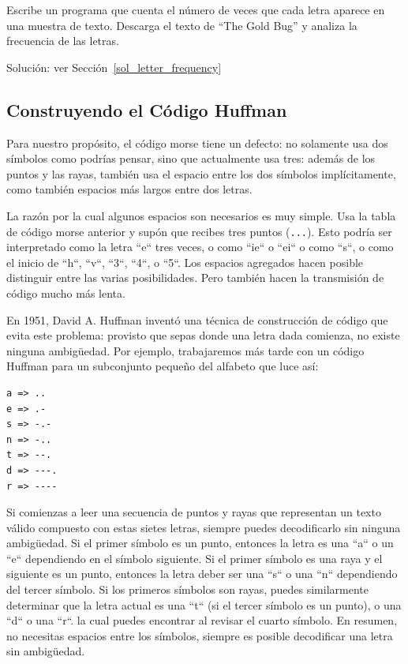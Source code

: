 \begin{exercise}
\label{letter_frequency}
Escribe un programa que cuenta el número de veces que cada letra 
aparece en una muestra de texto. Descarga el texto de ``The Gold Bug'' 
y analiza la frecuencia de las letras.

Solución: ver Sección~\ref{sol_letter_frequency}
\end{exercise}

\subsection{Construyendo el Código Huffman}

Para nuestro propósito, el código morse tiene un defecto: 
no solamente usa dos símbolos como podrías pensar, sino
que actualmente usa tres: además de los puntos y las rayas,
también usa el espacio entre los dos símbolos implícitamente,
como también espacios más largos entre dos letras.

La razón por la cual algunos espacios son necesarios es muy simple.
Usa la tabla de código morse anterior y supón que recibes 
tres puntos (\verb'...'). Esto podría ser interpretado como la letra
``e`` tres veces, o como ``ie`` o ``ei`` o como ``s``, o como el
inicio de ``h``, ``v``, ``3``, ``4``, o ``5``. Los espacios agregados 
hacen posible distinguir entre las varias posibilidades. Pero
también hacen la transmisión de código mucho más lenta.

En 1951, David A. Huffman inventó una técnica de construcción de código
que evita este problema: provisto que sepas donde una letra dada 
comienza, no existe ninguna ambigüedad. Por ejemplo, trabajaremos 
más tarde con un código Huffman para un subconjunto pequeño
del alfabeto que luce así:

\begin{verbatim}
a => ..
e => .-
s => -.-
n => -..
t => --.
d => ---.
r => ----
\end{verbatim}

Si comienzas a leer una secuencia de puntos y rayas que representan
un texto válido compuesto con estas sietes letras, siempre puedes
decodificarlo sin ninguna ambigüedad. Si el primer símbolo es 
un punto, entonces la letra es una ``a`` o un ``e`` dependiendo 
en el símbolo siguiente. Si el primer símbolo es una raya y 
el siguiente es un punto, entonces la letra deber ser una ``s`` o
una ``n`` dependiendo del tercer símbolo. Si los primeros símbolos
son rayas, puedes similarmente determinar que la letra actual es una
``t`` (si el tercer símbolo es un punto), o una ``d`` o una ``r``. 
la cual puedes encontrar al revisar el cuarto símbolo. En resumen, 
no necesitas espacios entre los símbolos, siempre es posible
decodificar una letra sin ambigüedad.

